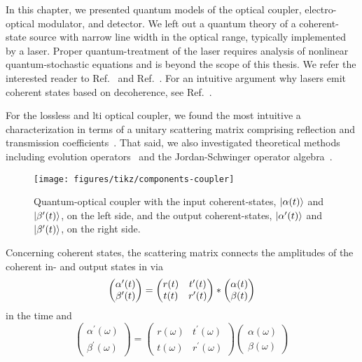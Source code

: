 
In this chapter, we presented quantum models of the optical coupler, electro-optical modulator, and detector.
We left out a quantum theory of a coherent-state source with narrow line width in the optical range, typically implemented by a laser.
Proper quantum-treatment of the laser requires analysis of nonlinear quantum-stochastic equations and is beyond the scope of this thesis.
We refer the interested reader to Ref.~\cite[p.~900]{Mandel1995} and Ref.~\cite{Haken2012,Gardiner2000}.
For an intuitive argument why lasers emit coherent states based on decoherence, see Ref.~\cite{Gea1998}.

For the lossless and \gls{lti} optical coupler, we found the most intuitive a characterization in terms of a unitary scattering matrix comprising reflection and transmission coefficients~\cite{Vogel2006}.
That said, we also investigated theoretical methods including evolution operators~\cite{Haroche2006} and the Jordan-Schwinger operator algebra~\cite{Leonhardt2003}.
\begin{figure}[htb]
    \centering
    \texttt{[image: figures/tikz/components-coupler]}
    \caption{Quantum-optical coupler with the input coherent-states, $\lvert\alpha(t)\rangle$ and $\lvert\beta^\prime(t)\rangle$, on the left side, and the output coherent-states, $\lvert\alpha^\prime(t)\rangle$ and $\lvert\beta^\prime(t)\rangle$, on the right side.}\label{fig:components_two_port}
\end{figure}
Concerning coherent states, the scattering matrix connects the amplitudes of the coherent in- and output states in  via
\begin{equation}
	\begin{pmatrix}
		\alpha^\prime(t)
		\\
		\beta^\prime(t)
	\end{pmatrix}
	=
	\begin{pmatrix}
		r(t) & t^\prime(t) \\
		t(t) & r^\prime(t)
	\end{pmatrix}
	\ast
	\begin{pmatrix}
		\alpha(t)
		\\
		\beta(t)
	\end{pmatrix}	
\end{equation}
in the time and
\begin{equation}
	\begin{pmatrix}
		\alpha^\prime(\omega)
		\\
		\beta^\prime(\omega)
	\end{pmatrix}
	=
	\begin{pmatrix}
		r(\omega) & t^\prime(\omega) \\
		t(\omega) & r^\prime(\omega)
	\end{pmatrix}
	\begin{pmatrix}
		\alpha(\omega)
		\\
		\beta(\omega)
	\end{pmatrix}	
\end{equation}
